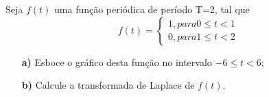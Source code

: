 \linespread{1.5}
Seja $f(t)$ uma função periódica de período T=2, tal que
\begin{equation*}
    f(t) = \begin{cases} 1, para 0 \leq t < 1\\
    0, para 1 \leq t < 2\end{cases}
\end{equation*}
\begin{itemize}
    \item[\textbf{a)}]Esboce o gráfico desta função no intervalo $-6 \leq t < 6$;
    \item[\textbf{b)}] Calcule a transformada de Laplace de $f(t)$.
\end{itemize}